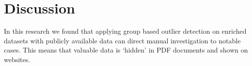 \documentclass{ou-report}
\begin{document}



\section{Discussion}
\label{sec:discussion}



In this research we found that applying group based outlier detection on 
enriched datasets with publicly available data 
can direct manual investigation to notable cases. This means that 
valuable data is `hidden’ in PDF documents and shown on websites. 
\end{document}
